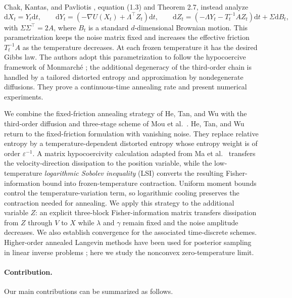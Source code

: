 \documentclass[11pt]{article}
\theoremstyle{definition}
\newcommand{\dd}{\mathrm d}
\newcommand{\eps}{\varepsilon}
\begin{document}
Chak, Kantas, and Pavliotis
\cite{ChakKantasPavliotis2023}, equation (1.3) and Theorem 2.7, instead analyze
\begin{equation}\label{eq:ckp}
 \dd X_t=Y_t\dd t,\qquad
 \dd Y_t=\left(-\nabla U(X_t)+\Lambda^\top Z_t\right)\dd t,\qquad
 \dd Z_t=\left(-\Lambda Y_t-T_t^{-1}A Z_t\right)\dd t+\Sigma\dd B_t,
\end{equation}
with $\Sigma\Sigma^\top=2A$, where $B_{t}$ is a standard $d$-dimensional Brownian motion.
This parametrization keeps the noise matrix fixed and increases the effective
friction $T_t^{-1}A$ as the temperature decreases. At each frozen temperature it
has the desired Gibbs law. The authors adopt this parametrization to follow the
hypocoercive framework of Monmarch\'e \cite{Monmarche2018}; the additional degeneracy
of the third-order chain is handled by a tailored distorted entropy and approximation
by nondegenerate diffusions. They prove a continuous-time annealing rate and present
numerical experiments.

We combine the fixed-friction annealing strategy of He, Tan, and Wu
\cite{HeTanWu2024} with the third-order diffusion and three-stage scheme of Mou et
al.\ \cite{MouEtAl2021}. 
He, Tan, and Wu \cite{HeTanWu2024} return to the fixed-friction formulation with
vanishing noise. They replace relative entropy by a temperature-dependent distorted
entropy whose entropy weight is of order $\eps^{-1}$. A matrix hypocoercivity
calculation adapted from Ma et al.\ \cite{MaEtAl2021} transfers the
velocity-direction dissipation to the position variable, while the low-temperature
\textit{logarithmic Sobolev inequality} (LSI) converts the resulting Fisher-information bound into frozen-temperature
contraction. Uniform
moment bounds control the temperature-variation term, so logarithmic cooling
preserves the contraction needed for annealing. We apply this strategy to the
additional variable $Z$: an explicit
three-block Fisher-information matrix transfers dissipation from $Z$ through $V$
to $X$ while $\lambda$ and $\gamma$ remain fixed and the noise amplitude decreases.
We also establish convergence for the associated time-discrete schemes.
Higher-order annealed Langevin methods have been used for posterior sampling in
linear inverse problems \cite{ZilbersteinEtAl2024}; here we study the nonconvex
zero-temperature limit.

\paragraph{Contribution.}
Our main contributions can be summarized as follows.
\end{document}
